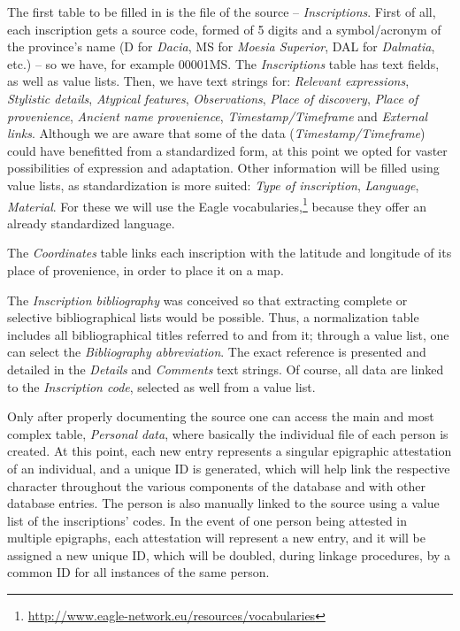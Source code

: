 \documentclass[amsthm,ebook]{saparticle}
\begin{document}
The first table to be filled in is the file of the source – \emph{Inscriptions}. First of all, each inscription gets a source
code, formed of 5 digits and a symbol/acronym of the province’s name (D for \emph{Dacia}, MS for \emph{Moesia Superior}, DAL for
\emph{Dalmatia}, etc.) – so we have, for example 00001MS. The \emph{Inscriptions} table has text fields, as well as value lists.
Then, we have text strings for: \emph{Relevant expressions}, \emph{Stylistic details}, \emph{Atypical features}, \emph{Observations}, \emph{Place of discovery}, \emph{Place of provenience}, \emph{Ancient name provenience}, \emph{Timestamp/Timeframe} and \emph{External links}. Although we are
aware that some of the data (\emph{Timestamp/Timeframe}) could have benefitted from a standardized form, at this point we
opted for vaster possibilities of expression and adaptation. Other information will be filled using value lists, as
standardization is more suited: \emph{Type of inscription}, \emph{Language}, \emph{Material}. For these we will use the Eagle
vocabularies,\footnote{\url{http://www.eagle-network.eu/resources/vocabularies}} because they offer an already
standardized language.

The \emph{Coordinates} table links each inscription with the latitude and longitude of its place of provenience, in order to
place it on a map. 

The \emph{Inscription bibliography} was conceived so that extracting complete or selective bibliographical lists would be
possible. Thus, a normalization table includes all bibliographical titles referred to and from it; through a value
list, one can select the \emph{Bibliography abbreviation}. The exact reference is presented and detailed in the \emph{Details} and
\emph{Comments} text strings. Of course, all data are linked to the \emph{Inscription code}, selected as well from a value list.

Only after properly documenting the source one can access the main and most complex table, \emph{Personal data}, where
basically the individual file of each person is created. At this point, each new entry represents a singular epigraphic
attestation of an individual, and a unique ID is generated, which will help link the respective character throughout
the various components of the database and with other database entries. The person is also manually linked to the
source using a value list of the inscriptions’ codes. In the event of one person being attested in
multiple epigraphs, each attestation will represent a new entry, and it will be assigned a new unique ID, which will be
doubled, during linkage procedures, by a common ID for all instances of the same person. 
\end{document}
